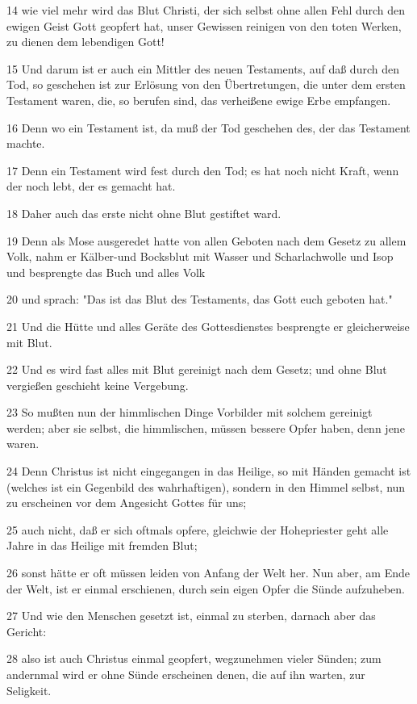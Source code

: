 \par 14 wie viel mehr wird das Blut Christi, der sich selbst ohne allen Fehl durch den ewigen Geist Gott geopfert hat, unser Gewissen reinigen von den toten Werken, zu dienen dem lebendigen Gott!
\par 15 Und darum ist er auch ein Mittler des neuen Testaments, auf daß durch den Tod, so geschehen ist zur Erlösung von den Übertretungen, die unter dem ersten Testament waren, die, so berufen sind, das verheißene ewige Erbe empfangen.
\par 16 Denn wo ein Testament ist, da muß der Tod geschehen des, der das Testament machte.
\par 17 Denn ein Testament wird fest durch den Tod; es hat noch nicht Kraft, wenn der noch lebt, der es gemacht hat.
\par 18 Daher auch das erste nicht ohne Blut gestiftet ward.
\par 19 Denn als Mose ausgeredet hatte von allen Geboten nach dem Gesetz zu allem Volk, nahm er Kälber-und Bocksblut mit Wasser und Scharlachwolle und Isop und besprengte das Buch und alles Volk
\par 20 und sprach: "Das ist das Blut des Testaments, das Gott euch geboten hat."
\par 21 Und die Hütte und alles Geräte des Gottesdienstes besprengte er gleicherweise mit Blut.
\par 22 Und es wird fast alles mit Blut gereinigt nach dem Gesetz; und ohne Blut vergießen geschieht keine Vergebung.
\par 23 So mußten nun der himmlischen Dinge Vorbilder mit solchem gereinigt werden; aber sie selbst, die himmlischen, müssen bessere Opfer haben, denn jene waren.
\par 24 Denn Christus ist nicht eingegangen in das Heilige, so mit Händen gemacht ist (welches ist ein Gegenbild des wahrhaftigen), sondern in den Himmel selbst, nun zu erscheinen vor dem Angesicht Gottes für uns;
\par 25 auch nicht, daß er sich oftmals opfere, gleichwie der Hohepriester geht alle Jahre in das Heilige mit fremden Blut;
\par 26 sonst hätte er oft müssen leiden von Anfang der Welt her. Nun aber, am Ende der Welt, ist er einmal erschienen, durch sein eigen Opfer die Sünde aufzuheben.
\par 27 Und wie den Menschen gesetzt ist, einmal zu sterben, darnach aber das Gericht:
\par 28 also ist auch Christus einmal geopfert, wegzunehmen vieler Sünden; zum andernmal wird er ohne Sünde erscheinen denen, die auf ihn warten, zur Seligkeit.

